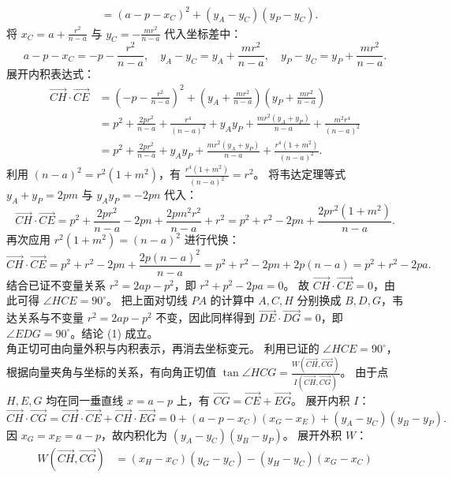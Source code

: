 \begin{solution}
\begin{align*}
&= (a - p - x_C)^2 + (y_A - y_C)(y_P - y_C).
\end{align*}
将 $x_C = a + \frac{r^2}{n - a}$ 与 $y_C = -\frac{m r^2}{n - a}$ 代入坐标差中：
\[ a - p - x_C = -p - \frac{r^2}{n - a}, \quad y_A - y_C = y_A + \frac{m r^2}{n - a}, \quad y_P - y_C = y_P + \frac{m r^2}{n - a}. \]
展开内积表达式：
\begin{align*}
\overrightarrow{CH} \cdot \overrightarrow{CE} &= \left(-p - \frac{r^2}{n - a}\right)^2 + \left(y_A + \frac{m r^2}{n - a}\right)\left(y_P + \frac{m r^2}{n - a}\right) \\
&= p^2 + \frac{2pr^2}{n - a} + \frac{r^4}{(n - a)^2} + y_A y_P + \frac{m r^2(y_A + y_P)}{n - a} + \frac{m^2 r^4}{(n - a)^2} \\
&= p^2 + \frac{2pr^2}{n - a} + y_A y_P + \frac{m r^2(y_A + y_P)}{n - a} + \frac{r^4(1 + m^2)}{(n - a)^2}.
\end{align*}
利用 $(n - a)^2 = r^2(1 + m^2)$，有 $\frac{r^4(1 + m^2)}{(n - a)^2} = r^2$。
将韦达定理等式 $y_A + y_P = 2pm$ 与 $y_A y_P = -2pn$ 代入：
\[ \overrightarrow{CH} \cdot \overrightarrow{CE} = p^2 + \frac{2pr^2}{n - a} - 2pn + \frac{2pm^2 r^2}{n - a} + r^2 = p^2 + r^2 - 2pn + \frac{2pr^2(1 + m^2)}{n - a}. \]
再次应用 $r^2(1 + m^2) = (n - a)^2$ 进行代换：
\[ \overrightarrow{CH} \cdot \overrightarrow{CE} = p^2 + r^2 - 2pn + \frac{2p(n - a)^2}{n - a} = p^2 + r^2 - 2pn + 2p(n - a) = p^2 + r^2 - 2pa. \]
结合已证不变量关系 $r^2 = 2ap - p^2$，即 $r^2 + p^2 - 2pa = 0$。
故 $\overrightarrow{CH} \cdot \overrightarrow{CE} = 0$，由此可得 $\angle HCE = 90^\circ$。
把上面对切线 $PA$ 的计算中 $A,C,H$ 分别换成 $B,D,G$，韦达关系与不变量 $r^2=2ap-p^2$ 不变，因此同样得到 $\overrightarrow{DE}\cdot\overrightarrow{DG}=0$，即 $\angle EDG = 90^\circ$。结论 (1) 成立。\\
角正切可由向量外积与内积表示，再消去坐标变元。
利用已证的 $\angle HCE = 90^\circ$，根据向量夹角与坐标的关系，有向角正切值 $\tan\angle HCG = \frac{W(\overrightarrow{CH}, \overrightarrow{CG})}{I(\overrightarrow{CH}, \overrightarrow{CG})}$。
由于点 $H, E, G$ 均在同一垂直线 $x = a - p$ 上，有 $\overrightarrow{CG} = \overrightarrow{CE} + \overrightarrow{EG}$。
展开内积 $I$：
\[ \overrightarrow{CH} \cdot \overrightarrow{CG} = \overrightarrow{CH} \cdot \overrightarrow{CE} + \overrightarrow{CH} \cdot \overrightarrow{EG} = 0 + (a - p - x_C)(x_G - x_E) + (y_A - y_C)(y_B - y_P). \]
因 $x_G = x_E = a - p$，故内积化为 $(y_A - y_C)(y_B - y_P)$。
展开外积 $W$：
\begin{align*}
W(\overrightarrow{CH}, \overrightarrow{CG}) &= (x_H - x_C)(y_G - y_C) - (y_H - y_C)(x_G - x_C) \\

\end{align*}
\end{solution}
